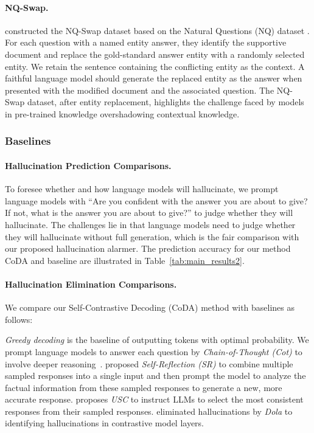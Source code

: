\paragraph{NQ-Swap. }\cite{longpre-etal-2021-entity} constructed the NQ-Swap dataset based on the Natural Questions (NQ) dataset \cite{kwiatkowski2019natural}. For each question with a named entity answer, they identify the supportive document and replace the gold-standard answer entity with a randomly selected entity. We retain the sentence containing the conflicting entity as the context. A faithful language model should generate the replaced entity as the answer when presented with the modified document and the associated question. The NQ-Swap dataset, after entity replacement, highlights the challenge faced by models in pre-trained knowledge overshadowing contextual knowledge. 



\subsubsection{Baselines}
\paragraph{Hallucination Prediction Comparisons. }
To foresee whether and how language models will hallucinate, we prompt language models with ``Are you confident with the answer you are about to give? If not, what is the answer you are about to give?'' to judge whether they will hallucinate.
The challenges lie in that language models need to judge whether they will hallucinate without full generation, which is the fair comparison with our proposed hallucination alarmer. The prediction accuracy for our method CoDA and baseline are illustrated in Table~\ref{tab:main_results2}.


\paragraph{Hallucination Elimination  Comparisons.}
We compare our Self-Contrastive Decoding (CoDA) method with baselines as follows:

\textit{Greedy decoding} is the baseline of outputting tokens with optimal probability.
We prompt language models to answer each question by \textit{Chain-of-Thought (Cot)} to involve deeper reasoning~\cite{wei2022chain}.
\citet{madaan2024self} proposed \textit{Self-Reflection (SR)} to combine multiple sampled responses into a single input and then prompt the model to analyze the factual information from these sampled responses to generate a new, more accurate response.
\citet{chen2023universal} proposes \textit{USC} to instruct LLMs to select the most consistent responses from their sampled responses.
\citet{chuang2023dola} eliminated hallucinations by \textit{Dola} to identifying hallucinations in contrastive model layers. 

